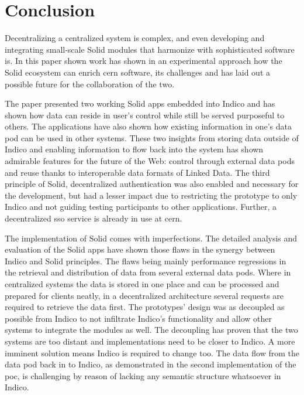 


\chapter{Conclusion}

Decentralizing a centralized system is complex, and even developing and integrating small-scale Solid modules that harmonize with sophisticated software is. In this paper shown work has shown in an experimental approach how the Solid ecosystem can enrich \gls{cern} software, its challenges and has laid out a possible future for the collaboration of the two.

The paper presented two working Solid apps embedded into Indico and has shown how data can reside in user's control while still be served purposeful to others. The applications have also shown how existing information in one's data pod can be used in other systems. These two insights from storing data outside of Indico and enabling information to flow back into the system has shown admirable features for the future of the Web: control through external data pods and reuse thanks to interoperable data formats of Linked Data. The third principle of Solid, decentralized authentication was also enabled and necessary for the development, but had a lesser impact due to restricting the prototype to only Indico and not guiding testing participants to other applications. Further, a decentralized \gls{sso} service is already in use at \gls{cern}.

The implementation of Solid comes with imperfections. The detailed analysis and evaluation of the Solid apps have shown those flaws in the synergy between Indico and Solid principles. The flaws being mainly performance regressions in the retrieval and distribution of data from several external data pods. Where in centralized systems the data is stored in one place and can be processed and prepared for clients neatly, in a decentralized architecture several requests are required to retrieve the data first. The prototypes' design was as decoupled as possible from Indico to not infiltrate Indico's functionality and allow other systems to integrate the modules as well. The decoupling has proven that the two systems are too distant and implementations need to be closer to Indico. A more imminent solution means Indico is required to change too. The data flow from the data pod back in to Indico, as demonstrated in the second implementation of the \gls{poc}, is challenging by reason of lacking any semantic structure whatsoever in Indico.

